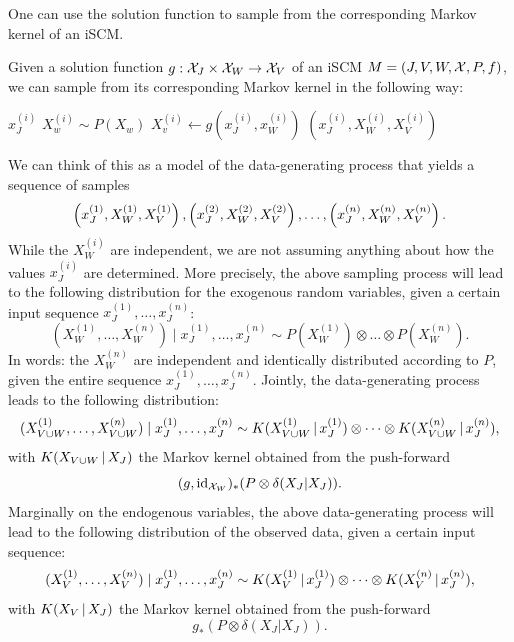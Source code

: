 One can use the solution function to sample from the corresponding Markov kernel of an iSCM. 
\begin{Rem}\label{rem:sampling_from_scm}
  Given a solution function $g : \mathcal{X}_{J} \times \mathcal{X}_{W} \to \mathcal{X}_{V}$ of an iSCM $M = \left ( J, V, W, \mathcal{X}, P, f \right )$,
  we can sample from its corresponding Markov kernel in the following way:
\begin{algorithmic}[1]
    \Input $x_J^{(i)}$
      \Sample $X_w^{(i)} \sim P(X_w)$
    \EndFor
      \Sample $X_v^{(i)} \leftarrow g(x_J^{(i)},x_W^{(i)})$
    \EndFor
    \Output $(x_J^{(i)},X_W^{(i)},X_V^{(i)})$
  \EndFor
\end{algorithmic}
\end{Rem}
We can think of this as a model of the data-generating process that yields a sequence of samples
$$\left ( x_J^{(1)},X_W^{(1)},X_V^{(1)} \right ), \left ( x_J^{(2)},X_W^{(2)},X_V^{(2)} \right ), \dots, \left ( x_J^{(n)},X_W^{(n)},X_V^{(n)}\right ).$$
While the $X_W^{(i)}$ are independent, we are not assuming anything about how the values $x_J^{(i)}$ are determined.
More precisely, the above sampling process will lead to the following distribution for the exogenous random variables, given a certain input sequence $x_J^{(1)},\dots,x_J^{(n)}$:
$$(X_W^{(1)},\dots,X_W^{(n)}) \mid x_J^{(1)}, \dots, x_J^{(n)} \sim P(X_W^{(1)}) \otimes \dots \otimes P(X_W^{(n)}).$$
In words: the $X_W^{(n)}$ are independent and identically distributed according to $P$, given the entire sequence $x_J^{(1)},\dots,x_J^{(n)}$.
Jointly, the data-generating process leads to the following distribution:
$$(X_{V\cup W}^{(1)},\dots,X_{V\cup W}^{(n)}) \mid x_J^{(1)}, \dots, x_J^{(n)} \sim K(X_{V\cup W}^{(1)} \operatorname*{|} x_J^{(1)}) \otimes \dots \otimes K(X_{V\cup W}^{(n)} \operatorname*{|} x_J^{(n)}),$$
with $K(X_{V\cup W} \operatorname*{|} X_J)$ the Markov kernel obtained from the push-forward
$$(g,\mathrm{id}_{\mathcal{X}_{W}})_* (P \otimes \delta(X_J|X_J)).$$
Marginally on the endogenous variables, the above data-generating process will lead to the following distribution of the observed data, given a certain input sequence:
$$(X_V^{(1)},\dots,X_V^{(n)}) \mid x_J^{(1)}, \dots, x_J^{(n)} \sim K(X_V^{(1)} \operatorname*{|} x_J^{(1)}) \otimes \dots \otimes K(X_V^{(n)} \operatorname*{|} x_J^{(n)}),$$
with $K(X_V \operatorname*{|} X_J)$ the Markov kernel obtained from the push-forward
$$g_* (P \otimes \delta(X_J|X_J)).$$

